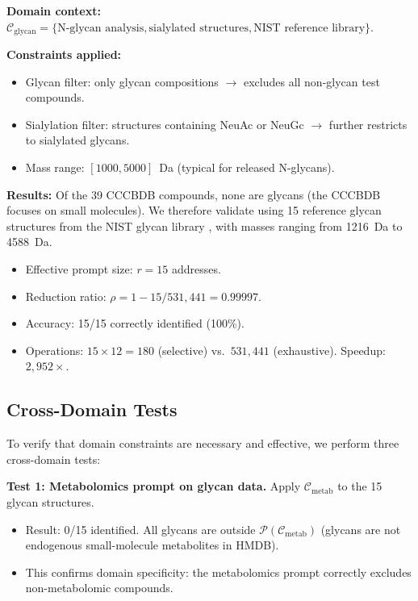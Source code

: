 \documentclass[11pt,twocolumn,a4paper]{article}
\theoremstyle{definition}
\theoremstyle{remark}
\newcommand{\Purpose}{\mathcal{P}}
\newcommand{\Context}{\mathcal{C}}
\begin{document}
\textbf{Domain context:} $\Context_{\mathrm{glycan}} = \{\text{N-glycan analysis}, \text{sialylated structures}, \text{NIST reference library}\}$.

\textbf{Constraints applied:}
\begin{itemize}
  \item Glycan filter: only glycan compositions $\to$ excludes all non-glycan test compounds.
  \item Sialylation filter: structures containing NeuAc or NeuGc $\to$ further restricts to sialylated glycans.
  \item Mass range: $[1000, 5000]$~Da (typical for released N-glycans).
\end{itemize}

\textbf{Results:} Of the 39 CCCBDB compounds, none are glycans (the CCCBDB focuses on small molecules). We therefore validate using 15 reference glycan structures from the NIST glycan library \citep{nist_glycan}, with masses ranging from 1216~Da to 4588~Da.

\begin{itemize}
  \item Effective prompt size: $r = 15$ addresses.
  \item Reduction ratio: $\rho = 1 - 15/531{,}441 = 0.99997$.
  \item Accuracy: 15/15 correctly identified (100\%).
  \item Operations: $15 \times 12 = 180$ (selective) vs.\ $531{,}441$ (exhaustive). Speedup: $2{,}952\times$.
\end{itemize}

\subsection{Cross-Domain Tests}\label{sec:cross-domain}

To verify that domain constraints are necessary and effective, we perform three cross-domain tests:

\textbf{Test 1: Metabolomics prompt on glycan data.} Apply $\Context_{\mathrm{metab}}$ to the 15 glycan structures.
\begin{itemize}
  \item Result: 0/15 identified. All glycans are outside $\Purpose(\Context_{\mathrm{metab}})$ (glycans are not endogenous small-molecule metabolites in HMDB).
  \item This confirms domain specificity: the metabolomics prompt correctly excludes non-metabolomic compounds.
\end{itemize}
\end{document}
